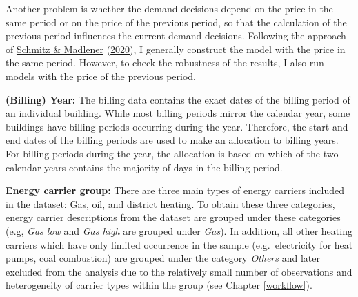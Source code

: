 \documentclass[12pt,twoside]{reedthesis}
\begin{document}
Another problem is whether the demand decisions depend on the price in the same period or on the price of the previous period, so that the calculation of the previous period influences the current demand decisions. Following the approach of \protect\hyperlink{ref-schmitz_madlener20}{Schmitz \& Madlener} (\protect\hyperlink{ref-schmitz_madlener20}{2020}), I generally construct the model with the price in the same period. However, to check the robustness of the results, I also run models with the price of the previous period.

\textbf{(Billing) Year:} The billing data contains the exact dates of the billing period of an individual building. While most billing periods mirror the calendar year, some buildings have billing periods occurring during the year. Therefore, the start and end dates of the billing periods are used to make an allocation to billing years. For billing periods during the year, the allocation is based on which of the two calendar years contains the majority of days in the billing period.

\textbf{Energy carrier group:} There are three main types of energy carriers included in the dataset: Gas, oil, and district heating. To obtain these three categories, energy carrier descriptions from the dataset are grouped under these categories (e.g, \emph{Gas low} and \emph{Gas high} are grouped under \emph{Gas}). In addition, all other heating carriers which have only limited occurrence in the sample (e.g.~electricity for heat pumps, coal combustion) are grouped under the category \emph{Others} and later excluded from the analysis due to the relatively small number of observations and heterogeneity of carrier types within the group (see Chapter \ref{workflow}).
\end{document}
